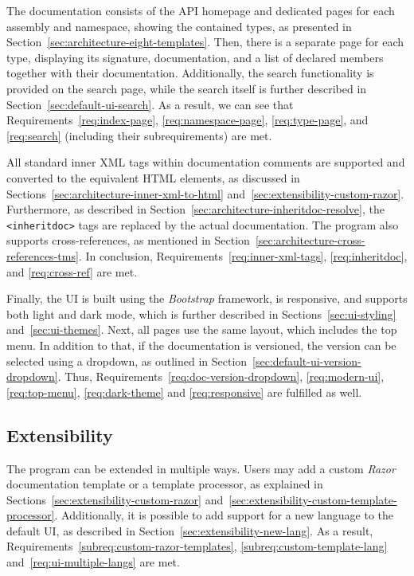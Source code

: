 The documentation consists of the API homepage and dedicated pages for each assembly and namespace, showing the contained types, as presented in Section~\ref{sec:architecture-eight-templates}.
Then, there is a separate page for each type, displaying its signature, documentation, and a list of declared members together with their documentation.
Additionally, the search functionality is provided on the search page, while the search itself is further described in Section~\ref{sec:default-ui-search}.
As a result, we can see that Requirements~\ref{req:index-page}, \ref{req:namespace-page}, \ref{req:type-page}, and \ref{req:search} (including their subrequirements) are met.

All standard inner XML tags within documentation comments are supported and converted to the equivalent HTML elements, as discussed in Sections~\ref{sec:architecture-inner-xml-to-html} and~\ref{sec:extensibility-custom-razor}.
Furthermore, as described in Section~\ref{sec:architecture-inheritdoc-resolve}, the \texttt{<inheritdoc>} tags are replaced by the actual documentation.
The program also supports cross-references, as mentioned in Section~\ref{sec:architecture-cross-references-tms}.
In conclusion, Requirements~\ref{req:inner-xml-tags}, \ref{req:inheritdoc}, and \ref{req:cross-ref} are met.

Finally, the UI is built using the \textit{Bootstrap} framework, is responsive, and supports both light and dark mode, which is further described in Sections~\ref{sec:ui-styling} and~\ref{sec:ui-themes}. 
Next, all pages use the same layout, which includes the top menu.
In addition to that, if the documentation is versioned, the version can be selected using a dropdown, as outlined in Section~\ref{sec:default-ui-version-dropdown}.
Thus, Requirements~\ref{req:doc-version-dropdown}, \ref{req:modern-ui}, \ref{req:top-menu}, \ref{req:dark-theme} and \ref{req:responsive} are fulfilled as well.

\subsection*{Extensibility}

The program can be extended in multiple ways.
Users may add a custom \textit{Razor} documentation template or a template processor, as explained in Sections~\ref{sec:extensibility-custom-razor} and~\ref{sec:extensibility-custom-template-processor}.
Additionally, it is possible to add support for a new language to the default UI, as described in Section~\ref{sec:extensibility-new-lang}.
As a result, Requirements~\ref{subreq:custom-razor-templates}, \ref{subreq:custom-template-lang} 
and~\ref{req:ui-multiple-langs} are met.


